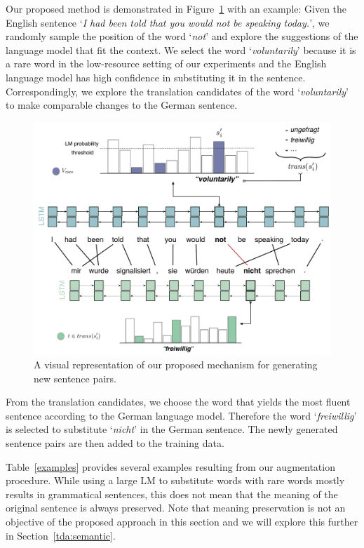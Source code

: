 Our proposed method is demonstrated in Figure~\ref{tdaposter} with an example:
Given the English sentence `\textit{I had been told that you would not be speaking today.}', we randomly sample the position of the word `\textit{not}' and explore the suggestions of the language model that fit the context. 
We select the word `\textit{voluntarily}' because it is a rare word in the low-resource setting of our experiments and the English language model has high confidence in substituting it in the sentence.
%
%
%
Correspondingly, we explore the translation candidates of the word `\textit{voluntarily}' to make comparable changes to the German sentence.
\begin{figure}[htb!]
\centering
\includegraphics[width=0.88\linewidth]{04-research-02/figs/dta.pdf}
\caption{A visual representation of our proposed mechanism for generating new sentence pairs.}
\label{tdaposter}
\end{figure}
From the translation candidates, we choose the word that yields the most fluent sentence according to the German language model.
Therefore the word `\textit{freiwillig}' is selected to substitute `\textit{nicht}' in the German sentence.
The newly generated sentence pairs are then added to the training data. 

Table~\ref{examples} provides several examples resulting from our augmentation procedure. 
While using a large LM to substitute words with rare words mostly results in grammatical sentences, this does not mean that the meaning of the original sentence is always preserved. 
Note that meaning preservation is not an objective of the proposed approach in this section and we will explore this further in Section~\ref{tda:semantic}.  

